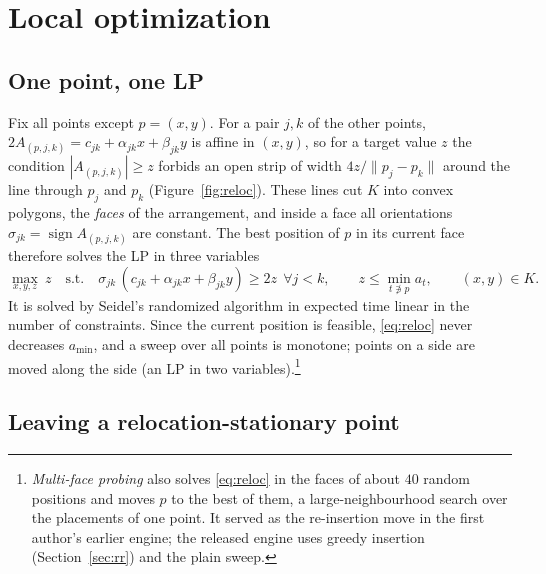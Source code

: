 \documentclass[11pt]{article}
\theoremstyle{remark}
\newcommand{\amin}{a_{\min}}
\begin{document}
\section{Local optimization}\label{sec:local}

\subsection{One point, one LP}\label{sec:reloc}

Fix all points except $p = (x,y)$. For a pair $j,k$ of the other points, $2A_{(p,j,k)} = c_{jk} + \alpha_{jk} x +
\beta_{jk} y$ is affine in $(x,y)$, so for a target value $z$ the condition $|A_{(p,j,k)}| \ge z$ forbids an open
strip of width $4z/\|p_j - p_k\|$ around the line through $p_j$ and $p_k$ (Figure~\ref{fig:reloc}). These lines cut
$K$ into convex polygons, the \emph{faces} of the arrangement, and inside a face all orientations
$\sigma_{jk} = \operatorname{sign} A_{(p,j,k)}$ are constant. The best position of $p$ in its current face therefore
solves the LP in three variables
\begin{equation}\label{eq:reloc}
  \max_{x,y,z}\ z \quad \text{s.t.} \quad \sigma_{jk}\,(c_{jk} + \alpha_{jk} x + \beta_{jk} y) \ge 2z \ \ \forall j<k,
  \qquad z \le \min_{t \not\ni p} a_t, \qquad (x,y) \in K .
\end{equation}
It is solved by Seidel's randomized algorithm \cite{Seidel91} in expected time linear in the number of constraints.
Since the current position is feasible, \eqref{eq:reloc} never decreases $\amin$, and a sweep over all points is
monotone; points on a side are moved along the side (an LP in two variables).\footnote{\emph{Multi-face probing} also
solves \eqref{eq:reloc} in the faces of about $40$ random positions and moves $p$ to the best of them, a
large-neighbourhood search over the placements of one point. It served as the re-insertion move in the first author's
earlier engine; the released engine uses greedy insertion (Section~\ref{sec:rr}) and the plain sweep.}

\subsection{Leaving a relocation-stationary point}\label{sec:ascent}
\end{document}
